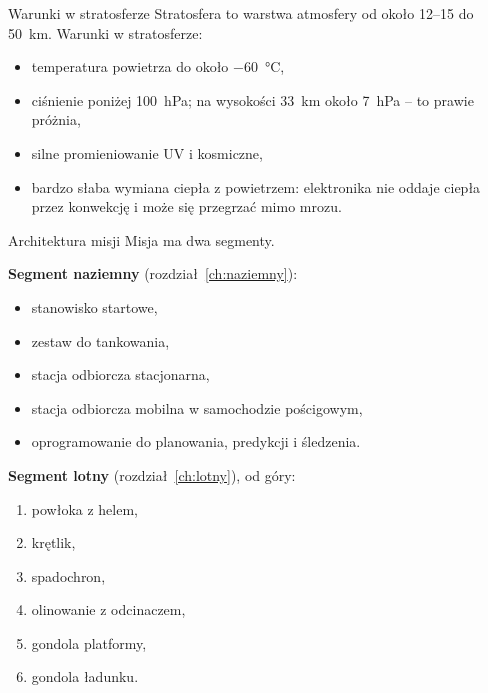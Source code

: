 \begin{sekcja}{Warunki w stratosferze}\label{sec:warunki}
Stratosfera to warstwa atmosfery od około 12--15 do \SI{50}{km}. Warunki w stratosferze:
\begin{itemize}
  \item temperatura powietrza do około \SI{-60}{\degreeCelsius},
  \item ciśnienie poniżej \SI{100}{hPa}; na wysokości \SI{33}{km} około \SI{7}{hPa} -- to prawie próżnia,
  \item silne promieniowanie UV i kosmiczne,
  \item bardzo słaba wymiana ciepła z powietrzem: elektronika nie oddaje ciepła przez konwekcję i może się przegrzać mimo mrozu.
\end{itemize}
\end{sekcja}

\begin{sekcja}{Architektura misji}
Misja ma dwa segmenty.

\begin{minipage}[t]{0.47\linewidth}
\textbf{Segment naziemny} (rozdział~\ref{ch:naziemny}):
\begin{itemize}
  \item stanowisko startowe,
  \item zestaw do tankowania,
  \item stacja odbiorcza stacjonarna,
  \item stacja odbiorcza mobilna w samochodzie pościgowym,
  \item oprogramowanie do planowania, predykcji i śledzenia.
\end{itemize}
\end{minipage}\hfill
\begin{minipage}[t]{0.47\linewidth}
\textbf{Segment lotny} (rozdział~\ref{ch:lotny}), od góry:
\begin{enumerate}
  \item powłoka z helem,
  \item krętlik,
  \item spadochron,
  \item olinowanie z odcinaczem,
  \item gondola platformy,
  \item gondola ładunku.
\end{enumerate}
\end{minipage}
\end{sekcja}

